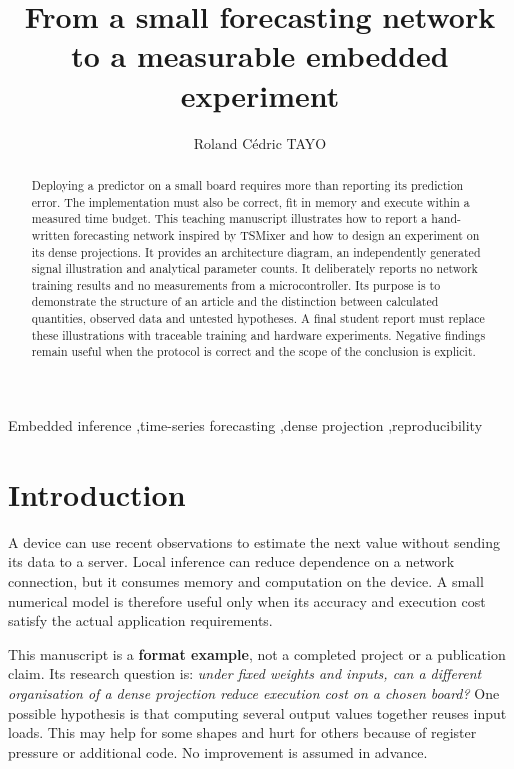 \documentclass[preprint,11pt,a4paper]{elsarticle}
\begin{document}
\begin{frontmatter}
\title{From a small forecasting network to a measurable embedded experiment}
\author{Roland Cédric TAYO}
\address{AI for Embedded Systems, 2026--2027}
\begin{abstract}
Deploying a predictor on a small board requires more than reporting its prediction error. The implementation must also be correct, fit in memory and execute within a measured time budget. This teaching manuscript illustrates how to report a hand-written forecasting network inspired by TSMixer and how to design an experiment on its dense projections. It provides an architecture diagram, an independently generated signal illustration and analytical parameter counts. It deliberately reports no network training results and no measurements from a microcontroller. Its purpose is to demonstrate the structure of an article and the distinction between calculated quantities, observed data and untested hypotheses. A final student report must replace these illustrations with traceable training and hardware experiments. Negative findings remain useful when the protocol is correct and the scope of the conclusion is explicit.
\end{abstract}
\begin{keyword}
Embedded inference \sep time-series forecasting \sep dense projection \sep reproducibility
\end{keyword}
\end{frontmatter}

\section{Introduction}
A device can use recent observations to estimate the next value without sending its data to a server. Local inference can reduce dependence on a network connection, but it consumes memory and computation on the device. A small numerical model is therefore useful only when its accuracy and execution cost satisfy the actual application requirements.

This manuscript is a \textbf{format example}, not a completed project or a publication claim. Its research question is: \emph{under fixed weights and inputs, can a different organisation of a dense projection reduce execution cost on a chosen board?} One possible hypothesis is that computing several output values together reuses input loads. This may help for some shapes and hurt for others because of register pressure or additional code. No improvement is assumed in advance.
\end{document}
